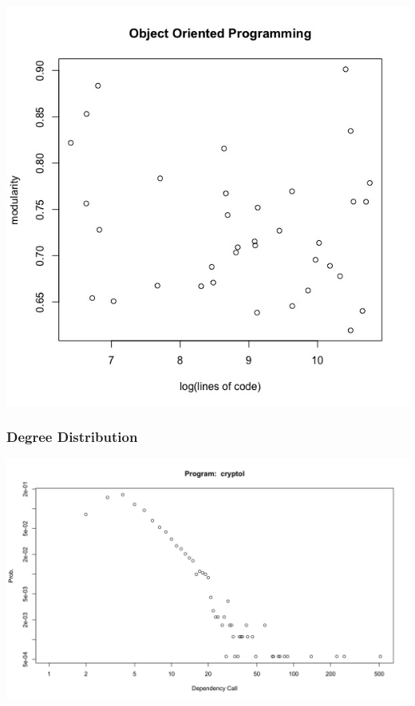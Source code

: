 \documentclass[12pt, a4paper]{article}
\begin{document}
  \begin{minipage}[t]{\linewidth}
    \includegraphics[width=\textwidth]{images/oop_lines_code_vs_modularity.jpeg}
    \captionsetup{type=figure}
    \label{fig:oop_log_lines_mod}
  \end{minipage}

\subsubsection{Degree Distribution}
  
\begin{minipage}[t]{\linewidth}
    \includegraphics[width=\textwidth]{power_law_fp.png}
    \captionsetup{type=figure}
    \label{fig:power_law_fp}
  \end{minipage}
\end{document}
